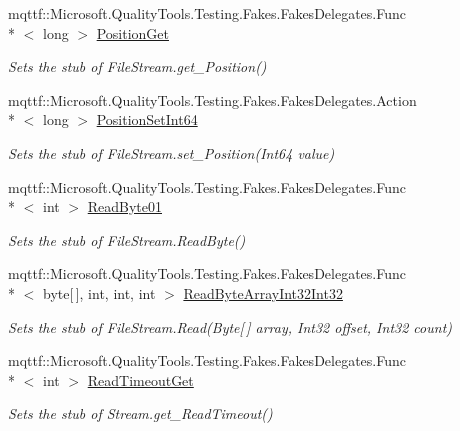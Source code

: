 \begin{DoxyCompactItemize}
mqttf\-::\-Microsoft.\-Quality\-Tools.\-Testing.\-Fakes.\-Fakes\-Delegates.\-Func\\*
$<$ long $>$ \hyperlink{class_system_1_1_i_o_1_1_fakes_1_1_stub_file_stream_af6212a0d1593fcb04a30a6ef3820fa34}{Position\-Get}
\begin{DoxyCompactList}\small\item\em Sets the stub of File\-Stream.\-get\-\_\-\-Position()\end{DoxyCompactList}\item 
mqttf\-::\-Microsoft.\-Quality\-Tools.\-Testing.\-Fakes.\-Fakes\-Delegates.\-Action\\*
$<$ long $>$ \hyperlink{class_system_1_1_i_o_1_1_fakes_1_1_stub_file_stream_aa61d15d19a0de6ec36381d03870d819c}{Position\-Set\-Int64}
\begin{DoxyCompactList}\small\item\em Sets the stub of File\-Stream.\-set\-\_\-\-Position(\-Int64 value)\end{DoxyCompactList}\item 
mqttf\-::\-Microsoft.\-Quality\-Tools.\-Testing.\-Fakes.\-Fakes\-Delegates.\-Func\\*
$<$ int $>$ \hyperlink{class_system_1_1_i_o_1_1_fakes_1_1_stub_file_stream_a6380aa2039aaf11cc1264224df5be6e3}{Read\-Byte01}
\begin{DoxyCompactList}\small\item\em Sets the stub of File\-Stream.\-Read\-Byte()\end{DoxyCompactList}\item 
mqttf\-::\-Microsoft.\-Quality\-Tools.\-Testing.\-Fakes.\-Fakes\-Delegates.\-Func\\*
$<$ byte\mbox{[}$\,$\mbox{]}, int, int, int $>$ \hyperlink{class_system_1_1_i_o_1_1_fakes_1_1_stub_file_stream_adf07bebf02cb1234a9f0c2d454a69471}{Read\-Byte\-Array\-Int32\-Int32}
\begin{DoxyCompactList}\small\item\em Sets the stub of File\-Stream.\-Read(\-Byte\mbox{[}$\,$\mbox{]} array, Int32 offset, Int32 count)\end{DoxyCompactList}\item 
mqttf\-::\-Microsoft.\-Quality\-Tools.\-Testing.\-Fakes.\-Fakes\-Delegates.\-Func\\*
$<$ int $>$ \hyperlink{class_system_1_1_i_o_1_1_fakes_1_1_stub_file_stream_a5155a35f0105a12ecd38533e948de3d1}{Read\-Timeout\-Get}
\begin{DoxyCompactList}\small\item\em Sets the stub of Stream.\-get\-\_\-\-Read\-Timeout()\end{DoxyCompactList}\item 

\end{DoxyCompactItemize}
